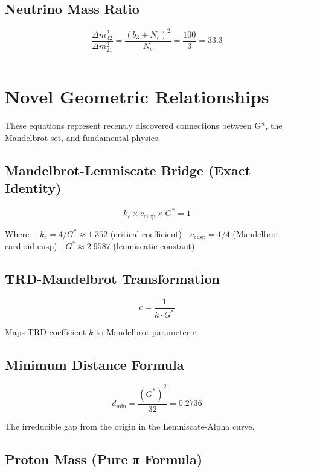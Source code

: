 \documentclass[
  11pt,
  letterpaper,
  twoside,
  openright]{book}
\begin{document}
\subsection{Neutrino Mass Ratio}\label{neutrino-mass-ratio}

\[
\frac{\Delta m^2_{32}}{\Delta m^2_{21}} = \frac{(b_3+N_c)^2}{N_c} = \frac{100}{3} = 33.3
\]

\begin{center}\rule{0.5\linewidth}{0.5pt}\end{center}

\section{Novel Geometric
Relationships}\label{novel-geometric-relationships}

These equations represent recently discovered connections between G*,
the Mandelbrot set, and fundamental physics.

\subsection{Mandelbrot-Lemniscate Bridge (Exact
Identity)}\label{mandelbrot-lemniscate-bridge-exact-identity}

\[
k_c \times c_{\text{cusp}} \times G^* = 1
\]

Where: - \(k_c = 4/G^* \approx 1.352\) (critical coefficient) -
\(c_{\text{cusp}} = 1/4\) (Mandelbrot cardioid cusp) -
\(G^* \approx 2.9587\) (lemniscatic constant)

\subsection{TRD-Mandelbrot
Transformation}\label{trd-mandelbrot-transformation}

\[
c = \frac{1}{k \cdot G^*}
\]

Maps TRD coefficient \(k\) to Mandelbrot parameter \(c\).

\subsection{Minimum Distance Formula}\label{minimum-distance-formula}

\[
d_{\min} = \frac{(G^*)^2}{32} = 0.2736
\]

The irreducible gap from the origin in the Lemniscate-Alpha curve.

\subsection{Proton Mass (Pure π
Formula)}\label{proton-mass-pure-ux3c0-formula}
\end{document}
